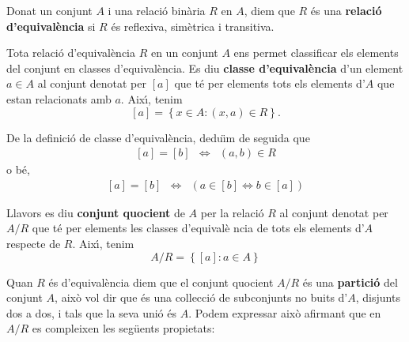 Donat un conjunt $A$ i una relaci\'{o} bin\`{a}ria $R$ en $A$, diem que $R$
\'{e}s una \textbf{relaci\'{o} d'equival\`{e}ncia} si $R$ \'{e}s reflexiva,
sim\`{e}trica i transitiva.

Tota relaci\'{o} d'equival\`{e}ncia $R$ en un conjunt $A$ ens permet
classificar els elements del conjunt en classes d'equival\`{e}ncia. Es diu
\textbf{classe d'equival\`{e}ncia} d'un element $a\in A$ al conjunt denotat
per $\left[ a\right] $ que t\'{e} per elements tots els elements d'$A$ que
estan relacionats amb $a$. Aix\'{\i}, tenim%
\begin{equation*}
\left[ a\right] =\left\{ x\in A:(x,a)\in R\right\} \text{.}
\end{equation*}

De la definici\'{o} de classe d'equival\`{e}ncia, dedu\"{\i}m de seguida que%
\begin{equation*}
\begin{array}{ccc}
\left[ a\right] =\left[ b\right] & \Longleftrightarrow & (a,b)\in R%
\end{array}
\end{equation*}
o b\'{e},%
\begin{equation*}
\begin{array}{ccc}
\left[ a\right] =\left[ b\right] & \Longleftrightarrow & \left( a\in\left[ b%
\right] \Longleftrightarrow b\in\left[ a\right] \right)%
\end{array}
\end{equation*}

Llavors es diu \textbf{conjunt quocient} de $A$ per la relaci\'{o} $R$ al
conjunt denotat per $A/R$ que t\'{e} per elements les classes d'equival\`{e}%
ncia de tots els elements d'$A$ respecte de $R$. Aix\'{\i}, tenim%
\begin{equation*}
A/R=\left\{ \left[ a\right] :a\in A\right\}
\end{equation*}

Quan $R$ \'{e}s d'equival\`{e}ncia diem que el conjunt quocient $A/R$ \'{e}s
una \textbf{partici\'{o}} del conjunt $A$, aix\`{o} vol dir que \'{e}s una
col\textperiodcentered lecci\'{o} de subconjunts no buits d'$A$, disjunts
dos a dos, i tals que la seva uni\'{o} \'{e}s $A$. Podem expressar aix\`{o}
afirmant que en $A/R$ es compleixen les seg\"{u}ents propietats:

